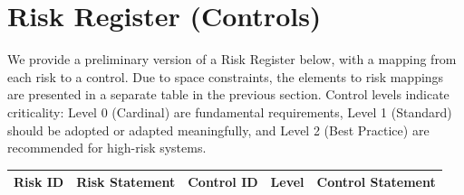 \documentclass{article}
\begin{document}
\section{Risk Register (Controls)}
\label{app:risk-register-controls}

We provide a preliminary version of a Risk Register below, with a mapping from each risk to a control. Due to space constraints, the elements to risk mappings are presented in a separate table in the previous section. Control levels indicate criticality: Level 0 (Cardinal) are fundamental requirements, Level 1 (Standard) should be adopted or adapted meaningfully, and Level 2 (Best Practice) are recommended for high-risk systems.

\begin{longtable}{|M{0.10\textwidth}|M{0.26\textwidth}|M{0.10\textwidth}|M{0.06\textwidth}|M{0.36\textwidth}|}
\color{white}\textbf{Risk ID} & \color{white}\textbf{Risk Statement} & \color{white}\textbf{Control ID} & \color{white}\textbf{Level} & \color{white}\textbf{Control Statement} \\
\hline
\endfirsthead


\end{longtable}
\end{document}
